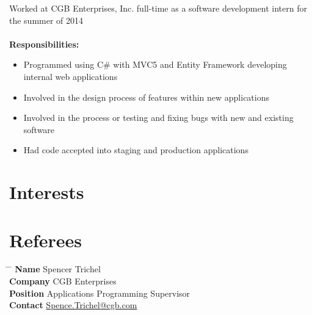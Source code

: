 \documentclass[9pt]{article} %
\begin{document}
Worked at CGB Enterprises, Inc. full-time as a software development intern for the summer of 2014 \\ \\
\textbf{Responsibilities:}
\begin{itemize}
\item Programmed using C\# with MVC5 and Entity Framework developing internal web applications
\item Involved in the design process of features within new applications
\item Involved in the process or testing and fixing bugs with new and existing software
\item Had code accepted into staging and production applications
\end{itemize}


\section{Interests}



\section{Referees}

\parbox{0.5\textwidth}{ %
\begin{tabbing}
\hspace{2.75cm} \= \hspace{4cm} \= \kill %
{\bf Name} \> Spencer Trichel \\ %
{\bf Company} \> CGB Enterprises \\ %
{\bf Position} \> Applications Programming Supervisor \\ %
{\bf Contact} \> \href{mailto:Spence.Trichel@cgb.com}{Spence.Trichel@cgb.com} %
\end{tabbing}}

\end{document}
